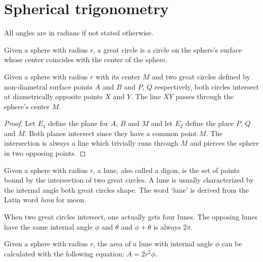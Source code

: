 \chapter{Spherical trigonometry}

All angles are in radians if not stated otherwise.

\begin{definition}
    Given a sphere with radius $r$, a great circle is a circle on the sphere's surface
    whose center coincides with the center of the sphere.
\end{definition}

\begin{theorem}
   Given a sphere with radius $r$ with its center $M$ and two great circles defined by 
   non-diametral surface points $A$ and $B$ and $P$, $Q$ respectively, both circles intersect at
   diametrically opposite points $X$ and $Y$.
   The line $\overline{XY}$ passes through the sphere's center $M$.
\end{theorem}
\begin{proof}
   Let $E_1$ define the plane for $A$, $B$ and $M$ and let $E_2$ define the place $P$, $Q$ and $M$.
   Both planes intersect since they have a common point $M$.
   The intersection is always a line which trivially runs through $M$ and pierces the sphere
   in two opposing points.
\end{proof}

\begin{definition}[Lune]
    Given a sphere with radius $r$, a lune, also called a digon, is the set of points bound
    by the intersection of two great circles.
    A lune is usually characterized by the internal angle both great circles shape.
    The word `lune' is derived from the Latin word \emph{luna} for moon.
\end{definition}

\begin{corollary}
    When two great circles intersect, one actually gets four lunes.
    The opposing lunes have the same internal angle $\phi$ and $\theta$ and $\phi+\theta$ 
    is always $2 \pi$.
\end{corollary}

\begin{lemma}
    Given a sphere with radius $r$, the area of a lune with internal angle $\phi$ 
    can be calculated with the following equation: $A = 2r^2\phi$.
\end{lemma}

